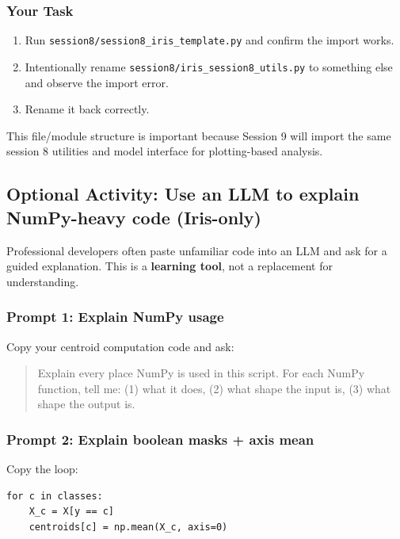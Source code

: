 \subsubsection{Your Task}
\begin{enumerate}
    \item Run \texttt{session8/session8\_iris\_template.py} and confirm the import works.
    \item Intentionally rename \texttt{session8/iris\_session8\_utils.py} to something else and observe the import error.
    \item Rename it back correctly.
\end{enumerate}

\noindent
This file/module structure is important because Session 9 will import the same session 8 utilities and model interface for plotting-based analysis.

\newpage
\subsection{Optional Activity: Use an LLM to explain NumPy-heavy code (Iris-only)}

\noindent
Professional developers often paste unfamiliar code into an LLM and ask for a guided explanation.
This is a \textbf{learning tool}, not a replacement for understanding.

\subsubsection{Prompt 1: Explain NumPy usage}
\noindent
Copy your centroid computation code and ask:

\begin{quote}
    Explain every place NumPy is used in this script. For each NumPy function, tell me:
    (1) what it does, (2) what shape the input is, (3) what shape the output is.
\end{quote}

\subsubsection{Prompt 2: Explain boolean masks + axis mean}
\noindent
Copy the loop:

\begin{verbatim}
for c in classes:
    X_c = X[y == c]
    centroids[c] = np.mean(X_c, axis=0)
\end{verbatim}

